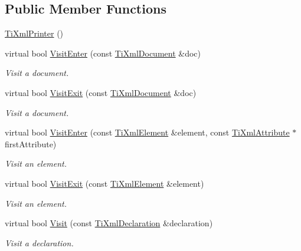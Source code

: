 \subsection*{Public Member Functions}
\begin{DoxyCompactItemize}
\item 
\hyperlink{classTiXmlPrinter_a6539b864026c8667cd0bd5fdf4b41f43}{TiXmlPrinter} ()
\item 
virtual bool \hyperlink{classTiXmlPrinter_a2ec73087db26ff4d2c4316c56f861db7}{VisitEnter} (const \hyperlink{classTiXmlDocument}{TiXmlDocument} \&doc)
\begin{DoxyCompactList}\small\item\em Visit a document. \item\end{DoxyCompactList}\item 
virtual bool \hyperlink{classTiXmlPrinter_a0a636046fa589b6d7f3e5bd025b3f33e}{VisitExit} (const \hyperlink{classTiXmlDocument}{TiXmlDocument} \&doc)
\begin{DoxyCompactList}\small\item\em Visit a document. \item\end{DoxyCompactList}\item 
virtual bool \hyperlink{classTiXmlPrinter_a6dccaf5ee4979f13877690afe28721e8}{VisitEnter} (const \hyperlink{classTiXmlElement}{TiXmlElement} \&element, const \hyperlink{classTiXmlAttribute}{TiXmlAttribute} $\ast$firstAttribute)
\begin{DoxyCompactList}\small\item\em Visit an element. \item\end{DoxyCompactList}\item 
virtual bool \hyperlink{classTiXmlPrinter_ae6a1df8271df4bf62d7873c38e34aa69}{VisitExit} (const \hyperlink{classTiXmlElement}{TiXmlElement} \&element)
\begin{DoxyCompactList}\small\item\em Visit an element. \item\end{DoxyCompactList}\item 
virtual bool \hyperlink{classTiXmlPrinter_adaf7eec4dc43ad071ff52b60361574f5}{Visit} (const \hyperlink{classTiXmlDeclaration}{TiXmlDeclaration} \&declaration)
\begin{DoxyCompactList}\small\item\em Visit a declaration. \item\end{DoxyCompactList}\item 

\end{DoxyCompactItemize}
